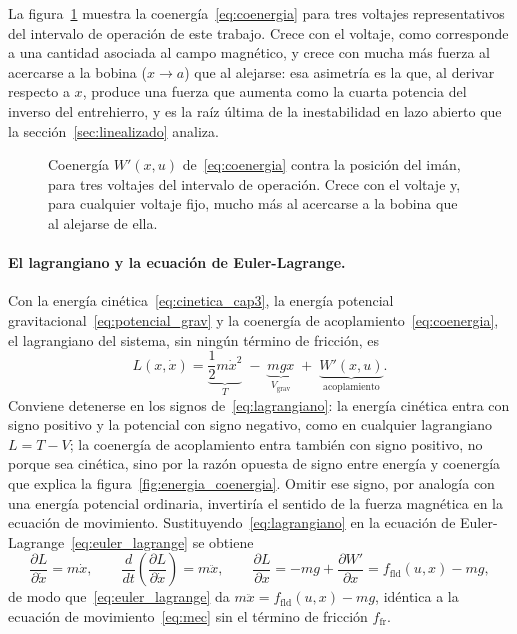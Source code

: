 La figura~\ref{fig:coenergia_posicion} muestra la coenergía~\eqref{eq:coenergia} para tres voltajes representativos del intervalo de operación de este trabajo. Crece con el voltaje, como corresponde a una cantidad asociada al campo magnético, y crece con mucha más fuerza al acercarse a la bobina ($x\to a$) que al alejarse: esa asimetría es la que, al derivar respecto a $x$, produce una fuerza que aumenta como la cuarta potencia del inverso del entrehierro, y es la raíz última de la inestabilidad en lazo abierto que la sección~\ref{sec:linealizado} analiza.

\begin{figure}[ht]
    \centering
    
    \caption[Coenergía magnética contra la posición]{Coenergía $W'(x,u)$ de~\eqref{eq:coenergia} contra la posición del imán, para tres voltajes del intervalo de operación. Crece con el voltaje y, para cualquier voltaje fijo, mucho más al acercarse a la bobina que al alejarse de ella.}
    \label{fig:coenergia_posicion}
\end{figure}

\paragraph{El lagrangiano y la ecuación de Euler-Lagrange.}
Con la energía cinética~\eqref{eq:cinetica_cap3}, la energía potencial gravitacional~\eqref{eq:potencial_grav} y la coenergía de acoplamiento~\eqref{eq:coenergia}, el lagrangiano del sistema, sin ningún término de fricción, es
\begin{equation}
L(x,\dot{x}) = \underbrace{\frac{1}{2}m\dot{x}^2}_{T} \;-\; \underbrace{mgx}_{V_{\text{grav}}} \;+\; \underbrace{W'(x,u)}_{\text{acoplamiento}} .
\label{eq:lagrangiano}
\end{equation}
Conviene detenerse en los signos de~\eqref{eq:lagrangiano}: la energía cinética entra con signo positivo y la potencial con signo negativo, como en cualquier lagrangiano $L=T-V$; la coenergía de acoplamiento entra también con signo positivo, no porque sea cinética, sino por la razón opuesta de signo entre energía y coenergía que explica la figura~\ref{fig:energia_coenergia}. Omitir ese signo, por analogía con una energía potencial ordinaria, invertiría el sentido de la fuerza magnética en la ecuación de movimiento. Sustituyendo~\eqref{eq:lagrangiano} en la ecuación de Euler-Lagrange~\eqref{eq:euler_lagrange} se obtiene
\begin{equation}
\frac{\partial L}{\partial \dot x} = m\dot x, \qquad
\frac{d}{dt}\left(\frac{\partial L}{\partial \dot x}\right) = m\ddot x, \qquad
\frac{\partial L}{\partial x} = -mg + \frac{\partial W'}{\partial x} = f_{\text{fld}}(u,x) - mg ,
\label{eq:el_pasos}
\end{equation}
de modo que~\eqref{eq:euler_lagrange} da $m\ddot{x} = f_{\text{fld}}(u,x) - mg$, idéntica a la ecuación de movimiento~\eqref{eq:mec} sin el término de fricción $f_{\text{fr}}$.

